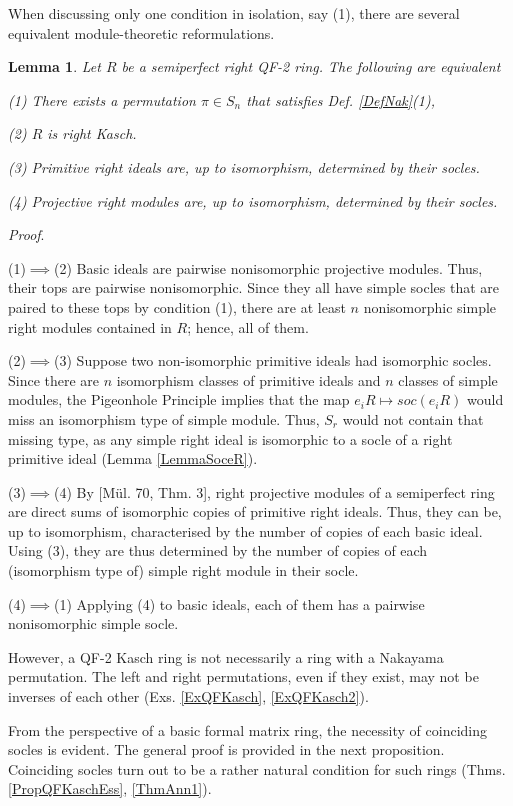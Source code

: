 \documentclass[11pt]{article}
\theoremstyle{plain}
\newtheorem{Lemma}[veta]{Lemma}
\theoremstyle{remark}
\theoremstyle{plain}
\newenvironment{Proof}{
  \par\medskip\noindent
  \textit{Proof}.
}{
\newline
\rightline{$\qedsymbol$}
}
\begin{document}
When discussing only one condition in isolation, say (1), there are several equivalent module-theoretic reformulations.
\begin{Lemma}\label{Lemma(1)}
    Let $R$ be a semiperfect right QF-2 ring. The following are equivalent 
    
     (1) There exists a permutation $\pi\in S_n$ that satisfies Def. \ref{DefNak}(1),

    (2) $R$ is right Kasch.

    (3) Primitive right ideals are, up to isomorphism, determined by their socles. 

    (4) Projective right modules are, up to isomorphism, determined by their socles. 
\end{Lemma}
\begin{Proof}
    (1)$\implies$(2) Basic ideals are pairwise nonisomorphic projective modules. Thus, their tops are pairwise nonisomorphic. Since they all have simple socles that are paired to these tops by condition (1), there are at least $n$ nonisomorphic simple right modules contained in $R$; hence, all of them.

    (2)$\implies$(3) Suppose two non-isomorphic primitive ideals had isomorphic socles. Since there are $n$ isomorphism classes of primitive ideals and $n$ classes of simple modules, the Pigeonhole Principle implies that the map $e_i R \mapsto soc(e_i R)$ would miss an isomorphism type of simple module. Thus, $S_r$ would not contain that missing type, as any simple right ideal is isomorphic to a socle of a right primitive ideal (Lemma \ref{LemmaSoceR}).
 

    (3)$\implies$(4) By [Mül. 70, Thm. 3], right projective modules of a semiperfect ring are direct sums of isomorphic copies of primitive right ideals. Thus, they can be, up to isomorphism, characterised by the number of copies of each basic ideal. Using (3), they are thus determined by the number of copies of each (isomorphism type of) simple right module in their socle. 

    (4)$\implies$(1) Applying (4) to basic ideals, each of them has a pairwise nonisomorphic simple socle. 
\end{Proof}

However, a QF-2 Kasch ring is not necessarily a ring with a Nakayama permutation. The left and right permutations, even if they exist, may not be inverses of each other (Exs. \ref{ExQFKasch}, \ref{ExQFKasch2}).

From the perspective of a basic formal matrix ring, the necessity of coinciding socles is evident. The general proof is provided in the next proposition. Coinciding socles turn out to be a rather natural condition for such rings (Thms. \ref{PropQFKaschEss}, \ref{ThmAnn1}).
\end{document}
